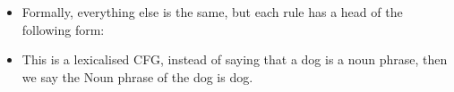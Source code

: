 \documentclass[11pt]{article}
\begin{document}
\begin{minipage}[l]{.5\linewidth}
    \begin{figure}[H]
        \centering
    \end{figure}    
\end{minipage}\hfill
\begin{minipage}[r]{.48\linewidth}
    \begin{itemize}
        \item Formally, everything else is the same, but each rule has a head of the following form:
    \end{itemize}
\end{minipage}

\begin{minipage}[l]{.5\linewidth}
    \begin{figure}[H]
        \centering
    \end{figure}    
\end{minipage}\hfill
\begin{minipage}[r]{.48\linewidth}
    \begin{itemize}
        \item This is a lexicalised CFG, instead of saying that a dog is a noun phrase, then we say the Noun phrase of the dog is dog.
    \end{itemize}
\end{minipage}
\end{document}

